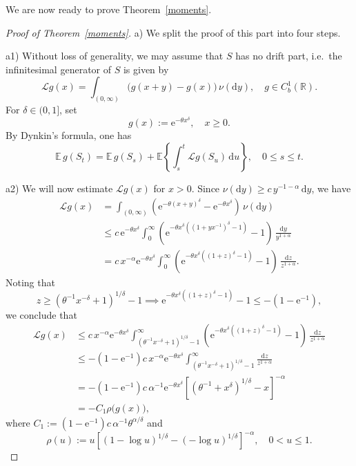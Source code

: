 \documentclass{aptpub}
\newcommand\EE{\mathds E}
\newcommand\R{\mathds R}
\newcommand\dup{\mathrm{d}}
\newcommand\eup{\mathrm{e}}                                %
\numberwithin{equation}{section}
\begin{document}
We are now ready to prove Theorem~\ref{moments}.
\begin{proof}[Proof of Theorem~\ref{moments}]
a) We split the proof of this part into four steps.

\medskip\noindent a1)
Without loss of generality, we may assume that $S$ has no drift part, i.e.\ the infinitesimal generator of $S$ is given by
$$
    \mathscr{L}g(x)
    =\int_{(0,\infty)}\big(g(x+y)-g(x)\big)\,\nu(\dup y),\quad g\in C_b^1(\R).
$$
For $\delta\in (0,1]$, set
$$
    g(x):=\eup^{-\theta x^\delta},\quad x\geq0.
$$
By Dynkin's formula, one has
\begin{equation}\label{dynkin}
    \EE\,g(S_t)
    =\EE\,g(S_s)+\EE\left\{\int_s^t\mathscr{L}g(S_u)\,\dup u\right\},\quad 0\leq s\leq t.
\end{equation}


\medskip\noindent a2)
We will now estimate $\mathscr{L}g(x)$ for $x>0$. Since $\nu(\dup y)\geq c\,y^{-1-\alpha}\,\dup y$, we have
\begin{align*}
    \mathscr{L}g(x)
    &=\int_{(0,\infty)} \left(\eup^{-\theta(x+y)^\delta} - \eup^{-\theta x^\delta} \right)\,\nu(\dup y)\\
    &\leq c\,\eup^{-\theta x^\delta} \int_0^\infty\left( \eup^{-\theta x^\delta\left((1+yx^{-1})^\delta-1\right)} -1\right)\,\frac{\dup y}{y^{1+\alpha}}\\
    &=c\,x^{-\alpha}\eup^{-\theta x^\delta} \int_0^\infty\left( \eup^{-\theta x^\delta\left((1+z)^\delta-1\right)} -1\right)\,\frac{\dup z}{z^{1+\alpha}}.
\end{align*}
Noting that
$$
    z\geq\left(\theta^{-1}x^{-\delta}+1\right)^{1/\delta}-1
    \implies
    \eup^{-\theta x^\delta\left((1+z)^\delta-1\right)}-1\leq-\left(1-\eup^{-1}\right),
$$
we conclude that
\begin{equation}\label{generator}
\begin{aligned}
    \mathscr{L}g(x)
    &\leq c\,x^{-\alpha}\eup^{-\theta x^\delta}\int_{\left(\theta^{-1}x^{-\delta}+1 \right)^{1/\delta}-1}^\infty\left( \eup^{-\theta x^\delta\left((1+z)^\delta-1\right)}-1\right)\,\frac{\dup z}{z^{1+\alpha}}\\
    &\leq -\left(1-\eup^{-1}\right)c\,x^{-\alpha}\eup^{-\theta x^\delta} \int_{\left(\theta^{-1}x^{-\delta}+1 \right)^{1/\delta}-1}^\infty\frac{\dup z}{z^{1+\alpha}}\\
    &=-\left(1-\eup^{-1}\right)c\,\alpha^{-1} \eup^{-\theta x^\delta}\left[\left(\theta^{-1}+x^\delta\right)^{1/\delta}-x\right]^{-\alpha}\\
    &=-C_1\rho\big(g(x)\big),
\end{aligned}
\end{equation}
where $C_1:=\left(1-\eup^{-1}\right)c\,\alpha^{-1}\theta^{\alpha/\delta}$ and
$$
    \rho(u)
    :=u\left[(1-\log u)^{1/\delta}-(-\log u)^{1/\delta}\right]^{-\alpha},\quad 0<u\leq1.
$$


\end{proof}
\end{document}
